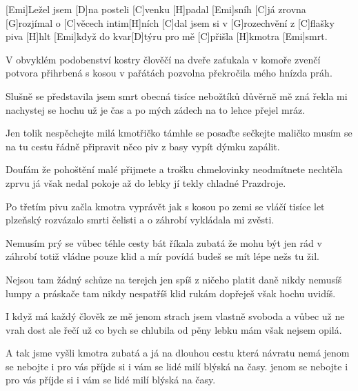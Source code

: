 
[Emi]Ležel jsem [D]na posteli [C]venku [H]padal [Emi]sníh
[C]já zrovna [G]rozjímal o [C]věcech intim[H]ních
[C]dal jsem si v [G]rozechvění z [C]flašky piva [H]hlt
[Emi]když do kvar[D]týru pro mě [C]přišla [H]kmotra [Emi]smrt.

\begin{multicols}{2}
V obvyklém podobenství kostry člověčí
na dveře zaťukala v komoře zvenčí
potvora přihrbená s kosou v pařátách
pozvolna překročila mého hnízda práh.

Slušně se představila jsem smrt obecná
tisíce nebožtíků důvěrně mě zná
řekla mi nachystej se hochu už je čas
a po mých zádech na to lehce přejel mráz.

Jen tolik nespěchejte milá kmotřičko
támhle se posaďte sečkejte maličko
musím se na tu cestu řádně připravit
něco piv z basy vypít dýmku zapálit.

Doufám že pohoštění malé přijmete
a trošku chmelovinky neodmítnete
nechtěla zprvu já však nedal pokoje
až do lebky jí tekly chladné Prazdroje.

Po třetím pivu začla kmotra vyprávět
jak s kosou po zemi se vláčí tisíce let
plzeňský rozvázalo smrti čelisti
a o záhrobí vykládala mi zvěsti.

Nemusím prý se vůbec téhle cesty bát
říkala zubatá že mohu být jen rád
v záhrobí totiž vládne pouze klid a mír
povídá budeš se mít lépe nežs tu žil.

Nejsou tam žádný schůze na terejch jen spíš
z ničeho platit daně nikdy nemusíš
lumpy a práskače tam nikdy nespatříš
klid rukám dopřeješ však hochu uvidíš.

I když má každý člověk ze mě jenom strach
jsem vlastně svoboda a vůbec už ne vrah
dost ale řečí už co bych se chlubila
od pěny lebku mám však nejsem opilá.

A tak jsme vyšli kmotra zubatá a já
na dlouhou cestu která návratu nemá
jenom se nebojte i pro vás příjde si
i vám se lidé milí blýská na časy.
jenom se nebojte i pro vás příjde si
i vám se lidé milí blýská na časy.
\end{multicols}